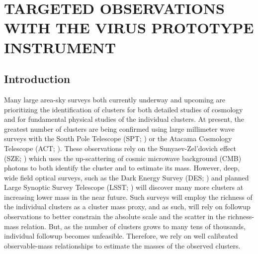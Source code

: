 %
%
%


\renewcommand*{\thefootnote}{\fnsymbol{footnote}}
\chapter[\uppercase{Targeted Observations with the VIRUS Prototype Instrument}]{\uppercase{Targeted Observations with the VIRUS Prototype Instrument} }
\renewcommand*{\thefootnote}{\arabic{footnote}}
\setcounter{footnote}{0}

\section{Introduction} 
Many large area-sky surveys both currently underway and upcoming are prioritizing the identification of clusters for both detailed studies of cosmology and for fundamental physical studies of the individual clusters. At present, the greatest number of clusters are being confirmed using large millimeter wave surveys with the South Pole Telescope (SPT; \citealt{Carlstrom2011}) or the Atacama Cosmology Telescope (ACT; \citealt{Swetz2011}). These observations rely on the Sunyaev-Zel'dovich effect (SZE; \citealt{Sunyaev1972}) which uses the up-scattering of cosmic microwave background (CMB) photons to both identify the cluster and to estimate its mass. However, deep, wide field optical surveys, such as the Dark Energy Survey (DES; \citealt{DES2005}) and planned Large Synoptic Survey Telescope (LSST; \citealt{LSST2012}) will discover many more clusters at increasing lower mass in the near future. Such surveys will employ the richness of the individual clusters as a cluster mass proxy, and as such, will rely on followup observations to better constrain the absolute scale and the scatter in the richness-mass relation. But, as the number of clusters grows to many tens of thousands, individual followup becomes unfeasible. Therefore, we rely on well calibrated observable-mass relationships to estimate the masses of the observed clusters.


